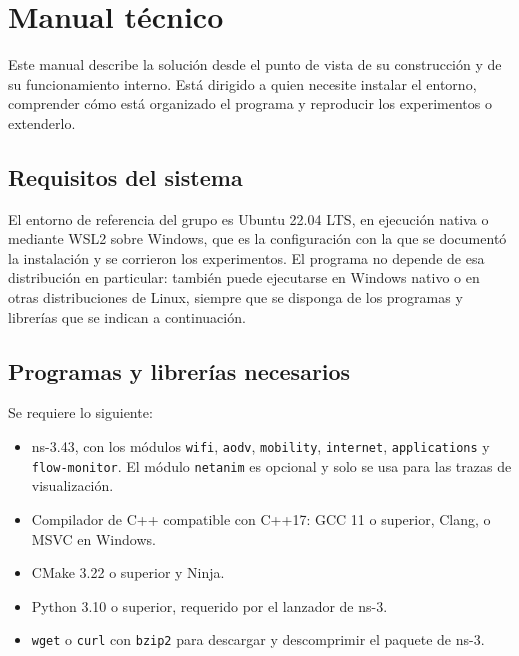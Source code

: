 \section{Manual técnico}
\label{sec:manual-tecnico}

Este manual describe la solución desde el punto de vista de su construcción y de su
funcionamiento interno. Está dirigido a quien necesite instalar el entorno, comprender
cómo está organizado el programa y reproducir los experimentos o extenderlo.

\subsection{Requisitos del sistema}

El entorno de referencia del grupo es Ubuntu 22.04 LTS, en ejecución nativa o mediante
WSL2 sobre Windows, que es la configuración con la que se documentó la instalación y se
corrieron los experimentos. El programa no depende de esa distribución en particular:
también puede ejecutarse en Windows nativo o en otras distribuciones de Linux, siempre
que se disponga de los programas y librerías que se indican a continuación.

\subsection{Programas y librerías necesarios}

Se requiere lo siguiente:

\begin{itemize}
    \item ns-3.43, con los módulos \texttt{wifi}, \texttt{aodv}, \texttt{mobility},
    \texttt{internet}, \texttt{applications} y \texttt{flow-monitor}. El módulo
    \texttt{netanim} es opcional y solo se usa para las trazas de visualización.
    \item Compilador de C++ compatible con C++17: GCC 11 o superior, Clang, o MSVC en
    Windows.
    \item CMake 3.22 o superior y Ninja.
    \item Python 3.10 o superior, requerido por el lanzador de ns-3.
    \item \texttt{wget} o \texttt{curl} con \texttt{bzip2} para descargar y descomprimir
    el paquete de ns-3.
\end{itemize}

